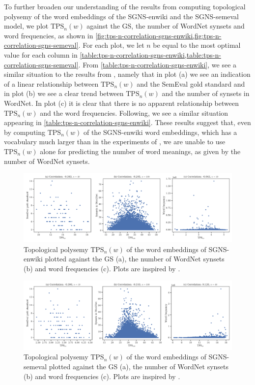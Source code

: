To further broaden our understanding of the results from computing topological polysemy of the word embeddings of the SGNS-enwiki and the SGNS-semeval model, we plot $\text{TPS}_n(w)$ against the GS, the number of WordNet synsets and word frequencies, as shown in \cref{fig:tps-n-correlation-sgns-enwiki,fig:tps-n-correlation-sgns-semeval}. For each plot, we let $n$ be equal to the most optimal value for each column in \cref{table:tps-n-correlation-sgns-enwiki,table:tps-n-correlation-sgns-semeval}. From \cref{table:tps-n-correlation-sgns-enwiki}, we see a similar situation to the results from \cite[Figures 8 and 9]{jakubowski2020topology}, namely that in plot (a) we see an indication of a linear relationship between $\text{TPS}_n(w)$ and the SemEval gold standard and in plot (b) we see a clear trend between $\text{TPS}_n(w)$ and the number of synsets in WordNet. In plot (c) it is clear that there is no apparent relationship between $\text{TPS}_n(w)$ and the word frequencies. Following, we see a similar situation appearing in \cref{table:tps-n-correlation-sgns-enwiki}. These results suggest that, even by computing $\text{TPS}_n(w)$ of the SGNS-enwiki word embeddings, which has a vocabulary much larger than in the experiments of \cite{jakubowski2020topology}, we are unable to use $\text{TPS}_n(w)$ alone for predicting the number of word meanings, as given by the number of WordNet synsets.
\begin{figure}[H]
    \centering
    \includegraphics[width=\textwidth]{thesis/figures/tps-n-correlation-sgns-enwiki.pdf}
    \caption{Topological polysemy $\text{TPS}_n(w)$ of the word embeddings of SGNS-enwiki plotted against the GS (a), the number of WordNet synsets (b) and word frequencies (c). Plots are inspired by \cite[Figures 8 and 9]{jakubowski2020topology}.}
    \label{fig:tps-n-correlation-sgns-enwiki}
\end{figure}
\begin{figure}[H]
    \centering
    \includegraphics[width=\textwidth]{thesis/figures/tps-n-correlation-sgns-semeval_2010_task_14.pdf}
    \caption{Topological polysemy $\text{TPS}_n(w)$ of the word embeddings of SGNS-semeval plotted against the GS (a), the number of WordNet synsets (b) and word frequencies (c). Plots are inspired by \cite[Figures 8 and 9]{jakubowski2020topology}.}
    \label{fig:tps-n-correlation-sgns-semeval}
\end{figure}
